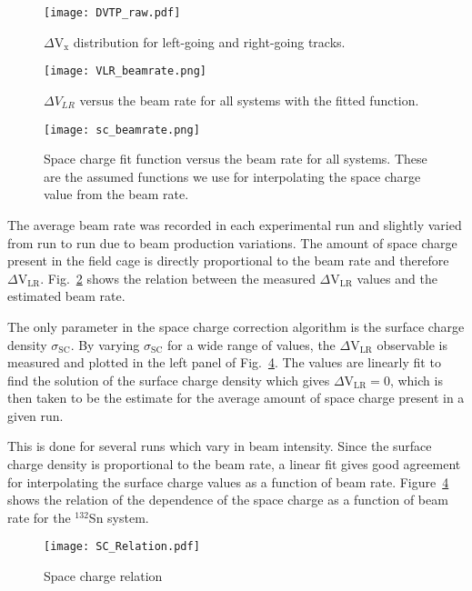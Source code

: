 \begin{figure}[!htb]
\centering
\texttt{[image: DVTP\_raw.pdf]}
\caption{$\Delta\mathrm{V}_\mathrm{x}$ distribution for left-going and right-going tracks. }
\label{fig:VLR}
\end{figure}



\begin{figure}[!htb]
\centering
\texttt{[image: VLR\_beamrate.png]}
\caption{ $\Delta V_{LR}$ versus the beam rate for all systems with the fitted function.}
\label{fig:VLR_br}
\end{figure}



\begin{figure}[!htb]
\centering
\texttt{[image: sc\_beamrate.png]}
\caption{Space charge fit function versus the beam rate for all systems. These are the assumed functions we use for interpolating the space charge value from the beam rate.}
\label{fig:spacechg_br_all}
\end{figure}

The average beam rate was recorded in each experimental run and slightly varied from run to run due to beam production variations. The amount of space charge present in the field cage is directly proportional to the beam rate and therefore $\Delta\mathrm{V}_\mathrm{LR}$.  Fig.~\ref{fig:VLR_br} shows the relation between the measured $\Delta\mathrm{V}_\mathrm{LR}$ values and the estimated beam rate. 

The only parameter in the space charge correction algorithm is the surface charge density $\sigma_{\mathrm{SC}}$. By varying $\sigma_{\mathrm{SC}}$ for a wide range of values, the $\Delta\mathrm{V}_\mathrm{LR}$ observable is measured and plotted in the left panel of Fig.~\ref{fig:spacechg_relation}. The values are linearly fit to find the solution of the surface charge density which gives $\Delta\mathrm{V}_\mathrm{LR} = 0$, which is then taken to be the estimate for the average amount of space charge present in a given run.

This is done for several runs which vary in beam intensity. Since the surface charge density is proportional to the beam rate, a linear fit gives good agreement for interpolating the surface charge values as a function of beam rate. Figure~\ref{fig:spacechg_relation} shows the relation of the dependence of the space charge as a function of beam rate for the ${}^{132}$Sn system.

\begin{figure}[!htb]
\texttt{[image: SC\_Relation.pdf]}
\caption{Space charge relation}
\label{fig:spacechg_relation}
\end{figure}


